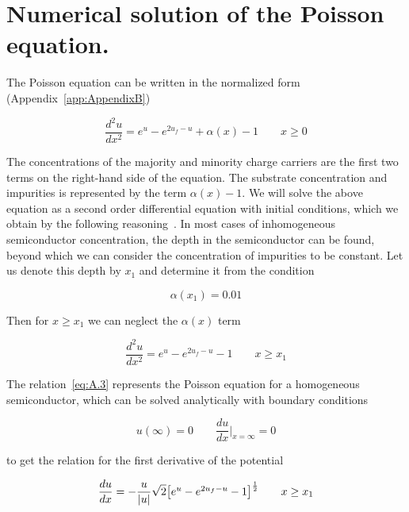 
\chapter{Numerical solution of the Poisson equation.}\label{app:AppendixA}
\raggedright{}

The Poisson equation can be written in the normalized form
(Appendix~\ref{app:AppendixB})

\begin{equation}\label{eq:A.1}
  \frac{d^2u}{dx^2} = e^u - e^{2u_f-u} + \alpha(x) - 1 \qquad {x\ge0}
\end{equation}

The concentrations of the majority and minority charge carriers are
the first two terms on the right-hand side of the equation. The
substrate concentration and impurities is represented by the term
$\alpha(x)-1$. We will solve the above equation as a second order
differential equation with initial conditions, which we obtain by the
following reasoning~\cite{App.1}. In most cases of inhomogeneous
semiconductor concentration, the depth in the semiconductor can be
found, beyond which we can consider the concentration of impurities to
be constant. Let us denote this depth by $x_1$ and determine it from
the condition

\begin{equation}\label{eq:A.2}
  \alpha(x_1) = 0.01
\end{equation}

Then for $x\ge{x_1}$ we can neglect the $\alpha(x)$ term

\begin{equation}\label{eq:A.3}
  \frac{d^2u}{dx^2} = e^u - e^{2u_f-u} - 1 \qquad {x\ge{x_1}}
\end{equation}

The relation~\ref{eq:A.3} represents the Poisson equation for a
homogeneous semiconductor, which can be solved analytically with
boundary conditions

\begin{equation}\label{eq:A.4}
  u(\infty) = 0 \qquad \frac{du}{dx}\Big\rvert_{x=\infty} = 0
\end{equation}

to get the relation for the first derivative of the potential

\begin{equation}\label{eq:A.5}
  \frac{du}{dx} = - \frac{u}{|u|} \sqrt{2} \big{[e^u - e^{2u_f-u} - 1 \big]}^{\frac{1}{2}} \qquad {x\ge{x_1}}
\end{equation}

